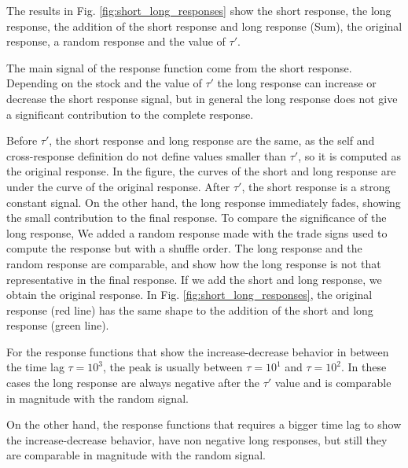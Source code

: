 The results in Fig. \ref{fig:short_long_responses} show the short response, the
long response, the addition of the short response and long response (Sum), the
original response, a random response and the value of $\tau'$.

The main signal of the response function come from the short response.
Depending on the stock and the value of $\tau'$ the long response can increase
or decrease the short response signal, but in general the long response does
not give a significant contribution to the complete response.

Before $\tau'$, the short response and long response are the same, as the self
and cross-response definition do not define values smaller than $\tau '$, so it
is computed as the original response. In the figure, the curves of the short
and long response are under the curve of the original response. After $\tau'$,
the short response is a strong constant signal. On the other hand, the long
response immediately fades, showing the small contribution to the final
response. To compare the significance of the long response, We added a random
response made with the trade signs used to compute the response but with a
shuffle order. The long response and the random response are comparable, and
show how the long response is not that representative in the final response.
If we add the short and long response, we obtain the original response. In Fig.
\ref{fig:short_long_responses}, the original response (red line) has the same
shape to the addition of the short and long response (green line).

For the response functions that show the increase-decrease behavior in between
the time lag $\tau = 10^{3}$, the peak is usually between $\tau = 10^{1}$ and
$\tau = 10^{2}$. In these cases the long response are always negative after the
$\tau'$ value and is comparable in magnitude with the random signal.

On the other hand, the response functions that requires a bigger time lag to
show the increase-decrease behavior, have non negative long responses, but
still they are comparable in magnitude with the random signal.